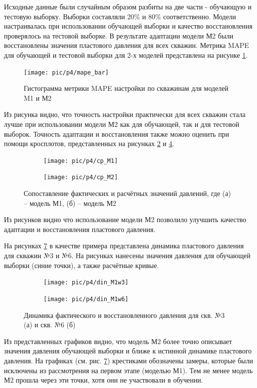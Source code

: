 \documentclass[14pt]{article}
\begin{document}
Исходные данные были случайным образом разбиты на две части - обучающую и тестовую выборку. Выборки составляли 20\% и 80\% соответственно. Модели настраивалась при использовании обучающей выборки и качество восстановления проверялось на тестовой выборке.
В результате адаптации модели М2 были восстановлены значения пластового давления для всех скважин. Метрика MAPE для обучающей и тестовой выборки для 2-х моделей представлена на рисунке \ref{fig:bar_mape_s1s2}.
\begin{figure}
	\centering
	\texttt{[image: pic/p4/mape\_bar]}
	\caption{Гистограмма метрики MAPE настройки по скважинам для моделей M1 и М2}
	\label{fig:bar_mape_s1s2}
\end{figure}
Из рисунка видно, что точность настройки практически для всех скважин стала лучше при использовании модели М2 как для обучающей, так и для тестовой выборок.
Точность адаптации и восстановления также можно оценить при помощи кросплотов, представленных на рисунках \ref{fig:well9_cp_m1} и \ref{fig:well9_cp_m2}.
\begin{figure}[!htb]
	\begin{subfigure}[b]{0.45\linewidth}
		\texttt{[image: pic/p4/cp\_M1]}
		\caption{}
		\label{fig:well9_cp_m1}
	\end{subfigure}
	\begin{subfigure}[b]{0.45\linewidth}
		\texttt{[image: pic/p4/cp\_M2]}
		\caption{}
		\label{fig:well9_cp_m2}
	\end{subfigure}
	\caption{Сопоставление фактических и расчётных значений давлений, где (а) -- модель М1, (б) -- модель М2}
	
\end{figure}
Из рисунков видно что использование модели М2 позволило улучшить качество адаптации и восстановления пластового давления.

На рисунках \ref{fig:din_9well_press} в качестве примера представлена динамика пластового давления для скважин №3 и №6. На рисунках нанесены значения давления для обучающей выборки (синие точки), а также расчётные кривые.

 \begin{figure}[!htb]
	\centering
	\begin{subfigure}[b]{0.9\linewidth}
		\texttt{[image: pic/p4/din\_M1w3]}
		\caption{}
		\label{fig:din_9well_press_3}
	\end{subfigure}
	\begin{subfigure}[b]{0.9\linewidth}
		\texttt{[image: pic/p4/din\_M1w6]}
		\caption{}
		\label{fig:din_9well_press_6}
	\end{subfigure}
	\caption{Динамика фактического и восстановленного давления для скв. №3 (а) и скв. №6 (б)}
	\label{fig:din_9well_press}
\end{figure}
Из представленных графиков видно, что модель М2 более точно описывает значения давления обучающей выборки и ближе к истинной динамике пластового давления.
На графиках (см. рис. \ref{fig:din_9well_press}) крестиками обозначены замеры, которые были исключены из рассмотрения на первом этапе (моделью М1). Тем не менее модель М2 прошла через эти точки, хотя они не участвовали в обучении.
\end{document}
